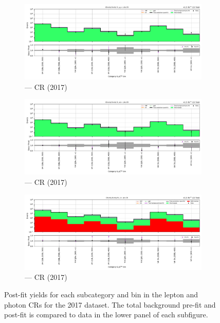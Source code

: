 \begin{figure}[htbp]
    \begin{subfigure}[b]{0.49\textwidth}
        \includegraphics[width=\textwidth]{chapters/higgstoinv/figures/mountain_ranges/2017/VH/Zmumu_tree_fit_b-abs_values_VH_cats.pdf}
        \caption{\VH --- \doubleMuCr \gls{CR} (2017)}
    \end{subfigure}
    \hfill
    \begin{subfigure}[b]{0.49\textwidth}
        \includegraphics[width=\textwidth]{chapters/higgstoinv/figures/mountain_ranges/2017/VH/Zee_tree_fit_b-abs_values_VH_cats.pdf}
        \caption{\VH --- \doubleEleCr \gls{CR} (2017)}
    \end{subfigure}

    \begin{subfigure}[b]{0.49\textwidth}
        \includegraphics[width=\textwidth]{chapters/higgstoinv/figures/mountain_ranges/2017/VH/Photon_tree_fit_b-abs_values_VH_cats.pdf}
        \caption{\VH --- \singlePhotonCr \gls{CR} (2017)}
    \end{subfigure}
    \caption[Post-fit yields for each \VH subcategory and \ptmiss bin in the lepton and photon control regions for the 2017 dataset]{Post-fit yields for each \VH subcategory and \ptmiss bin in the lepton and photon \glspl{CR} for the 2017 dataset. The total background pre-fit and post-fit is compared to data in the lower panel of each subfigure.}
    \label{fig:htoinv_mountain_range_VH_2017_CRs}
\end{figure}

